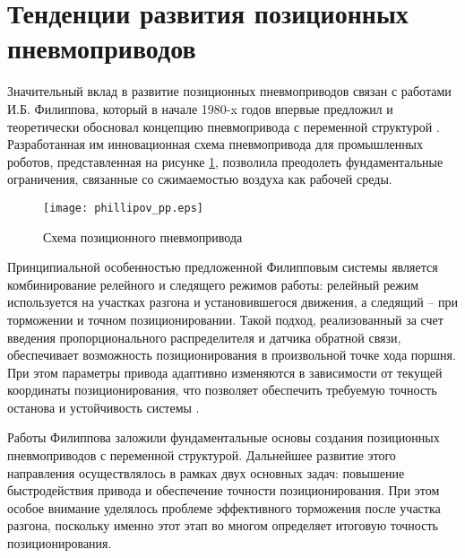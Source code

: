 \section{Тенденции развития позиционных пневмоприводов}\label{sec:ch1/sec2}

Значительный вклад в развитие позиционных пневмоприводов связан с работами И.Б. Филиппова, который в начале 1980-x
годов впервые предложил и теоретически обосновал концепцию пневмопривода с переменной структурой \cite*{филиппов:позиц_след_пневмопривод}.
Разработанная им инновационная схема пневмопривода для промышленных роботов, представленная на рисунке \ref*{fig:phillipov_positioning},
позволила преодолеть фундаментальные ограничения, связанные со сжимаемостью воздуха как рабочей среды.

\begin{figure}[ht]
	\centerfloat
	\texttt{[image: phillipov\_pp.eps]}
	\caption{Схема позиционного пневмопривода}\label{fig:phillipov_positioning}
\end{figure}

Принципиальной особенностью предложенной Филипповым системы является комбинирование релейного и следящего режимов
работы: релейный режим используется на участках разгона и установившегося движения, а следящий -- при торможении и
точном позиционировании. Такой подход, реализованный за счет введения
пропорционального распределителя и датчика обратной связи, обеспечивает возможность
позиционирования в произвольной точке хода поршня. При этом параметры привода адаптивно
изменяются в зависимости от текущей координаты позиционирования, что позволяет обеспечить требуемую
точность останова и устойчивость системы \cite*{shortnikov:a}.


Работы Филиппова заложили фундаментальные основы создания позиционных пневмоприводов с переменной структурой. Дальнейшее развитие
этого направления осуществлялось в рамках двух основных задач: повышение быстродействия привода и обеспечение
точности позиционирования. При этом особое внимание уделялось проблеме эффективного торможения после участка
разгона, поскольку именно этот этап во многом определяет итоговую точность позиционирования.

